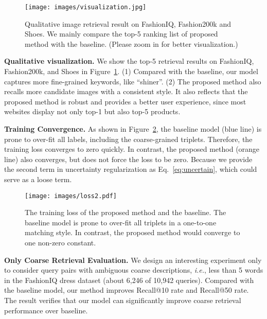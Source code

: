 \documentclass[10pt,twocolumn,letterpaper]{article}
\def\ie{\emph{i.e.}}
\begin{document}
\begin{figure}[t]
\begin{center}\vspace{-.1in}
\texttt{[image: images/visualization.jpg]}
\vspace{-.2in}
\caption{Qualitative image retrieval result on FashionIQ, Fashion200k and Shoes. We mainly compare the top-5 ranking list of proposed method with the baseline. (Please zoom in for better visualization.)}
\label{fig:visualization}
\vspace{-.2in}
\end{center}
\end{figure}


\noindent\textbf{Qualitative visualization.}
We show the top-5 retrieval results on FashionIQ, Fashion200k, and Shoes in Figure~\ref{fig:visualization}. 
(1) Compared with the baseline, our model captures more fine-grained keywords, like ``shiner''.
(2) The proposed method also recalls more candidate images with a consistent style. It also reflects that the proposed method is robust and provides a better user experience, since most websites display not only top-1 but also top-5 products. 

\noindent\textbf{Training Convergence.} As shown in Figure~\ref{fig:loss}, the baseline model (blue line) is prone to over-fit all labels, including the coarse-grained triplets. Therefore, the training loss converges to zero quickly. In contrast, the proposed method (orange line) also converges, but does not force the loss to be zero. Because we provide the second term in uncertainty regularization as Eq.~\ref{eq:uncertain}, which could serve as a loose term. 

\begin{figure}[t]
\begin{center}
\texttt{[image: images/loss2.pdf]}
\vspace{-.2in}
\caption{The training loss of the proposed method and the baseline. The baseline model is prone to over-fit all triplets in a one-to-one matching style. In contrast, the proposed method would converge to one non-zero constant.}
\label{fig:loss}\vspace{-.2in}
\end{center}
\end{figure}

\noindent\textbf{Only Coarse Retrieval Evaluation.} We design an interesting experiment only to consider query pairs with ambiguous coarse descriptions, \ie, less than 5 words in the FashionIQ dress dataset (about 6,246 of 10,942 queries). Compared with the baseline model, our method improves  Recall@10 rate and  Recall@50 rate. The result verifies that our model can significantly improve coarse retrieval performance over baseline.
\end{document}
